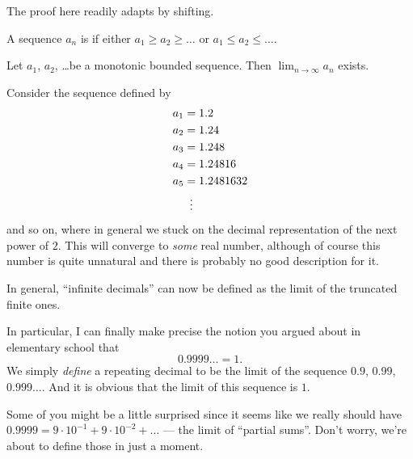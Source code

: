 The proof here readily adapts by shifting.
\begin{definition}
	A sequence $a_n$ is 
	if either $a_1 \ge a_2 \ge \dots$
	or $a_1 \le a_2 \le \dots$.
\end{definition}

\begin{theorem}
	Let $a_1$, $a_2$, \dots be a monotonic bounded sequence.
	Then $\lim_{n \to \infty} a_n$ exists.
	\label{thm:monotonic_bounded}
\end{theorem}

\begin{example}
	Consider the sequence defined by
	\begin{align*}
		a_1 &= 1.2 \\
		a_2 &= 1.24 \\
		a_3 &= 1.248 \\
		a_4 &= 1.24816 \\
		a_5 &= 1.2481632 \\
		&\vdotswithin=
	\end{align*}
	and so on, where in general we stuck
	on the decimal representation of the next power of $2$.
	This will converge to \emph{some} real number,
	although of course this number
	is quite unnatural and there is probably no good description for it.
\end{example}
In general, ``infinite decimals''
can now be defined as the limit of the truncated finite ones.

\begin{example}
	[$0.9999\dots = 1$]
	In particular, I can finally make precise the notion
	you argued about in elementary school that
	\[ 0.9999\dots = 1. \]
	We simply \emph{define} a repeating decimal
	to be the limit of the sequence $0.9$, $0.99$, $0.999\dots$.
	And it is obvious that the limit of this sequence is $1$.
\end{example}

Some of you might be a little surprised since
it seems like we really should have
$0.9999 = 9 \cdot 10^{-1} + 9 \cdot 10^{-2} + \dots$ ---
the limit of ``partial sums''.
Don't worry, we're about to define those in just a moment.

\medskip

